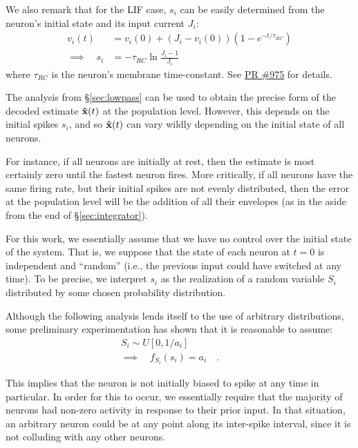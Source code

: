 We also remark that for the LIF case, $s_i$ can be easily determined from the neuron's initial state and its input current $J_i$:
\begin{align*}
v_i(t) &= v_i(0) + (J_i - v_i(0))(1 - e^{-t/\tau_{RC}}) \\
\implies \quad s_i &= -\tau_{RC} \ln \frac{J_i - 1}{J_i}
\end{align*}
where $\tau_{RC}$ is the neuron's membrane time-constant. See \href{https://github.com/nengo/nengo/pull/975}{PR \#975} for details.

The analysis from \S\ref{sec:lowpass} can be used to obtain the precise form of the decoded estimate $\mathbf{\tilde{x}}(t)$ at the population level. However, this depends on the initial spikes $s_i$, and so $\mathbf{\tilde{x}}(t)$ can vary wildly depending on the initial state of all neurons.

For instance, if all neurons are initially at rest, then the estimate is most certainly zero until the fastest neuron fires. More critically, if all neurons have the same firing rate, but their initial spikes are not evenly distributed, then the error at the population level will be the addition of all their envelopes (as in the aside from the end of \S\ref{sec:integrator}).

For this work, we essentially assume that we have no control over the initial state of the system. That is, we suppose that the state of each neuron at $t = 0$ is independent and ``random'' (i.e., the previous input could have switched at any time). To be precise, we interpret $s_i$ as the realization of a random variable $S_i$ distributed by some chosen probability distribution.

Although the following analysis lends itself to the use of arbitrary distributions, some preliminary experimentation has shown that it is reasonable to assume:
\begin{equation}
\begin{gathered}
\label{eq:s}
S_i \sim U[0, 1/a_i] \\
\implies \quad f_{S_i}(s_i) = a_i \quad .  \quad \quad 
\end{gathered}
\end{equation}

This implies that the neuron is not initially biased to spike at any time in particular. In order for this to occur, we essentially require that the majority of neurons had non-zero activity in response to their prior input. In that situation, an arbitrary neuron could be at any point along its inter-spike interval, since it is not colluding with any other neurons.


